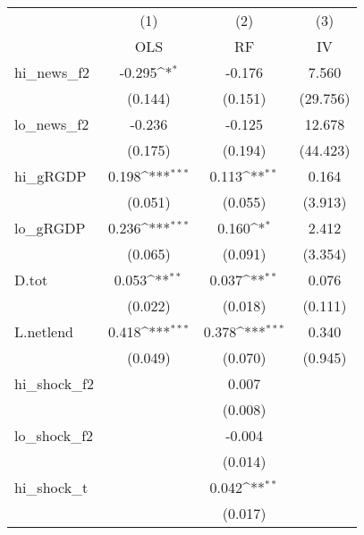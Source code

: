 {
\def\sym#1{\ifmmode^{#1}\else\(^{#1}\)\fi}
\begin{tabular}{l*{3}{c}}
\toprule
            &\multicolumn{1}{c}{(1)}&\multicolumn{1}{c}{(2)}&\multicolumn{1}{c}{(3)}\\
            &\multicolumn{1}{c}{OLS}&\multicolumn{1}{c}{RF}&\multicolumn{1}{c}{IV}\\
\midrule
hi\_news\_f2  &      -0.295\sym{*}  &      -0.176         &       7.560         \\
            &     (0.144)         &     (0.151)         &    (29.756)         \\
\addlinespace
lo\_news\_f2  &      -0.236         &      -0.125         &      12.678         \\
            &     (0.175)         &     (0.194)         &    (44.423)         \\
\addlinespace
hi\_gRGDP    &       0.198\sym{***}&       0.113\sym{**} &       0.164         \\
            &     (0.051)         &     (0.055)         &     (3.913)         \\
\addlinespace
lo\_gRGDP    &       0.236\sym{***}&       0.160\sym{*}  &       2.412         \\
            &     (0.065)         &     (0.091)         &     (3.354)         \\
\addlinespace
D.tot       &       0.053\sym{**} &       0.037\sym{**} &       0.076         \\
            &     (0.022)         &     (0.018)         &     (0.111)         \\
\addlinespace
L.netlend   &       0.418\sym{***}&       0.378\sym{***}&       0.340         \\
            &     (0.049)         &     (0.070)         &     (0.945)         \\
\addlinespace
hi\_shock\_f2 &                     &       0.007         &                     \\
            &                     &     (0.008)         &                     \\
\addlinespace
lo\_shock\_f2 &                     &      -0.004         &                     \\
            &                     &     (0.014)         &                     \\
\addlinespace
hi\_shock\_t  &                     &       0.042\sym{**} &                     \\
            &                     &     (0.017)         &                     \\

\end{tabular}}
